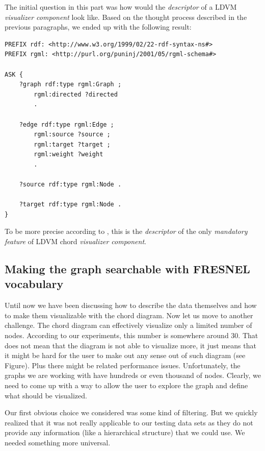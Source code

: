 The initial question in this part was how would the \emph{descriptor} of a LDVM \emph{visualizer component} look like. Based on the thought process described in the previous paragraphs, we ended up with the following result:

\begin{verbatim}
PREFIX rdf: <http://www.w3.org/1999/02/22-rdf-syntax-ns#>
PREFIX rgml: <http://purl.org/puninj/2001/05/rgml-schema#>

ASK {
    ?graph rdf:type rgml:Graph ;
        rgml:directed ?directed 
        .
            
    ?edge rdf:type rgml:Edge ;
        rgml:source ?source ;
        rgml:target ?target ;
        rgml:weight ?weight 
        .
            
    ?source rdf:type rgml:Node .
    
    ?target rdf:type rgml:Node .
}
\end{verbatim}

To be more precise according to \cite{ldvm_use_cases}, this is the \emph{descriptor} of the only \emph{mandatory feature} of LDVM chord \emph{visualizer component}.

\subsection{Making the graph searchable with FRESNEL vocabulary}
\label{sec:visualizers:chord:fresnel}


Until now we have been discussing how to describe the data themselves and how to make them visualizable with the chord diagram. Now let us move to another challenge. The chord diagram can effectively visualize only a limited number of nodes. According to our experiments, this number is somewhere around 30. That does not mean that the diagram is not able to visualize more, it just means that it might be hard for the user to make out any sense out of such diagram (see Figure). Plus there might be related performance issues. Unfortunately, the graphs we are working with have hundreds or even thousand of nodes. Clearly, we need to come up with a way to allow the user to explore the graph and define what should be visualized.

Our first obvious choice we considered was some kind of filtering. But we quickly realized that it was not really applicable to our testing data sets as they do not provide any information (like a hierarchical structure) that we could use. We needed something more universal.

